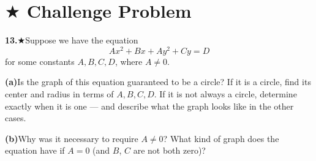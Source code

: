 \documentclass[12pt]{article}
\begin{document}
\vspace{4.5cm}

\newpage
\section*{$\bigstar$ Challenge Problem}

\textbf{13.}\quad$\bigstar$\quad Suppose we have the equation
\[
  Ax^2 + Bx + Ay^2 + Cy = D
\]
for some constants $A, B, C, D$, where $A \neq 0$.

\medskip
\textbf{(a)}\quad Is the graph of this equation guaranteed to be a circle? If it is a circle, find its center and radius in terms of $A, B, C, D$. If it is not always a circle, determine exactly when it is one --- and describe what the graph looks like in the other cases.

\vspace{9cm}
\textbf{(b)}\quad Why was it necessary to require $A \neq 0$? What kind of graph does the equation have if $A = 0$ (and $B$, $C$ are not both zero)?

\vspace{4cm}

\end{document}
